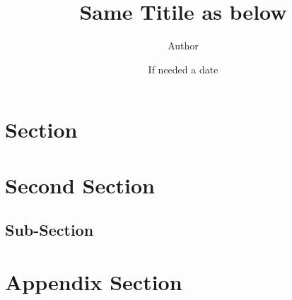 \documentclass[12pt]{article}
\title{Same Titile as below}
\author{Author}
\date{If needed a date}
\begin{document}
\maketitle

\section{Section}
\lipsum[2-4] \cite{customlabel}


\section{Second Section}
\lipsum[2-4]
\subsection{Sub-Section}
\lipsum[2-4]


\begingroup
\setlength{\emergencystretch}{.5em}
\printbibliography
\endgroup


\appendix

\section{Appendix Section}
\lipsum[2-4]
\end{document}
